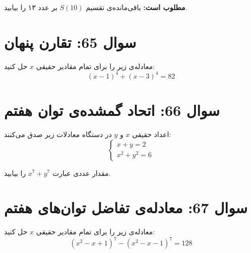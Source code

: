 \documentclass[12pt]{article}
\begin{document}
	\textbf{مطلوب است:} باقی‌مانده‌ی تقسیم \(S(10)\) بر عدد ۱۳ را بیابید.
	
	\vspace{1cm}
	\hrulefill
	\vspace{1cm}
	
	\section*{سوال 65: تقارن پنهان}
	معادله‌ی زیر را برای تمام مقادیر حقیقی \(x\) حل کنید:
	\begin{displaymath}
		(x-1)^4 + (x-3)^4 = 82
	\end{displaymath}
	
	\vspace{1cm}
	\hrulefill
	\vspace{1cm}
	
	\section*{سوال 66: اتحاد گمشده‌ی توان هفتم}
	اعداد حقیقی \(x\) و \(y\) در دستگاه معادلات زیر صدق می‌کنند:
	\begin{displaymath}
		\begin{cases}
			x + y = 2 \\
			x^2 + y^2 = 6
		\end{cases}
	\end{displaymath}
	\vspace{0.5cm}
	
	مقدار عددی عبارت \( x^7 + y^7 \) را بیابید.
	
	\vspace{1cm}
	\hrulefill
	\vspace{1cm}
	
	\section*{سوال 67: معادله‌ی تفاضل توان‌های هفتم}
	معادله‌ی زیر را برای تمام مقادیر حقیقی \(x\) حل کنید:
	\begin{displaymath}
		(x^2 - x + 1)^7 - (x^2 - x - 1)^7 = 128
	\end{displaymath}
	
\end{document}
